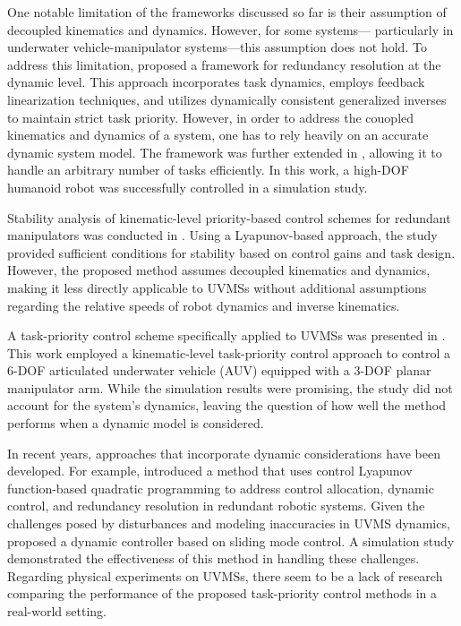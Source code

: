 One notable limitation of the frameworks discussed so far is their assumption 
of decoupled kinematics and dynamics. However, for some systems—
particularly in underwater vehicle-manipulator systems—this 
assumption does not hold. To address this limitation, \cite{khatib1987} 
proposed a framework for redundancy resolution at the dynamic level. This 
approach incorporates task dynamics, employs feedback linearization techniques, 
and utilizes dynamically consistent generalized inverses \cite{khatib1995} to 
maintain strict task priority.
However, in order to address the couopled kinematics and dynamics of a system, one has to rely heavily on an accurate
dynamic system model.
The framework was further extended in \cite{khatib2004,sentis2004}, 
allowing it to handle an arbitrary number of tasks efficiently. In this work, a 
high-DOF humanoid robot was successfully controlled in a simulation study.

Stability analysis of kinematic-level priority-based control schemes for 
redundant manipulators was conducted in \cite{antonelli2009}. Using a 
Lyapunov-based approach, the study provided sufficient conditions for stability 
based on control gains and task design. However, the proposed method assumes 
decoupled kinematics and dynamics, making it less directly applicable to UVMSs 
without additional assumptions regarding the relative speeds of robot dynamics 
and inverse kinematics.

A task-priority control scheme specifically applied to UVMSs was presented in 
\cite{antonelli1998}. This work employed a kinematic-level task-priority 
control approach to control a 6-DOF articulated underwater vehicle (AUV) 
equipped with a 3-DOF planar manipulator arm. While the simulation results were 
promising, the study did not account for the system's dynamics, leaving the question
of how well the method performs when a dynamic model is considered.

In recent years, approaches that incorporate dynamic considerations have been 
developed. For example, \cite{basso2020} introduced a method that uses control 
Lyapunov function-based quadratic programming to address control allocation, 
dynamic control, and redundancy resolution in redundant robotic systems. Given 
the challenges posed by disturbances and modeling inaccuracies in UVMS 
dynamics, \cite{iversflaten2022} proposed a dynamic controller based on sliding 
mode control. A simulation study demonstrated the effectiveness of this method 
in handling these challenges. Regarding physical experiments on UVMSs, there 
seem to be a lack of research comparing the performance of the proposed 
task-priority control methods in a real-world setting.

